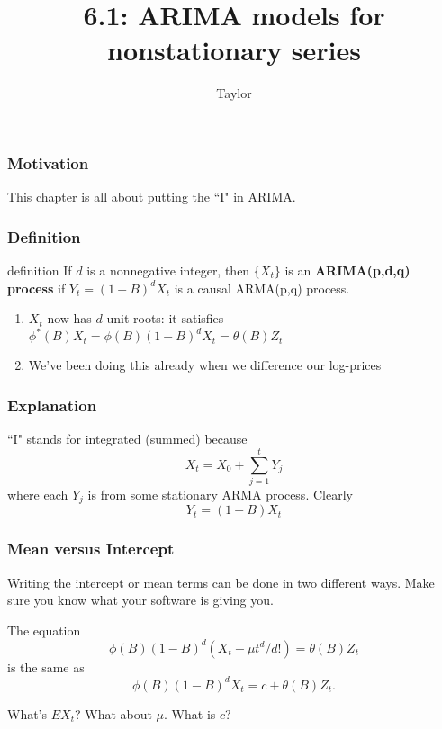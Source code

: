 \documentclass{beamer}
\title["6.1"]{6.1: ARIMA models for nonstationary series}
\author{Taylor}
\institute[UVA] 
{
University of Virginia \\
\medskip
\textit{} 
}
\date{}
\begin{document}

\begin{frame}
\titlepage 
\end{frame}


\begin{frame}
\frametitle{Motivation}

This chapter is all about putting the ``I" in ARIMA. 


\end{frame}


\begin{frame}
\frametitle{Definition}

\begin{block}{definition}
If $d$ is a nonnegative integer, then $\{X_t\}$ is an {\bf ARIMA(p,d,q) process } if $Y_t = (1-B)^dX_t$ is a causal ARMA(p,q) process.
\end{block}

\begin{enumerate}
\item $X_t$ now has $d$ unit roots: it satisfies $\phi^*(B)X_t = \phi(B)(1-B)^d X_t = \theta(B)Z_t $
\item We've been doing this already when we difference our log-prices
\end{enumerate}
\end{frame}

\begin{frame}
\frametitle{Explanation}

``I" stands for integrated (summed) because 
\[
X_t = X_0 + \sum_{j=1}^t Y_j
\]
where each $Y_j$ is from some stationary ARMA process. Clearly
\[
Y_t = (1-B)X_t 
\]

\end{frame}


\begin{frame}
\frametitle{Mean versus Intercept}

Writing the intercept or mean terms can be done in two different ways. Make sure you know what your software is giving you.
\newline

The equation
\[
\phi(B)(1-B)^d(X_t - \mu t^d / d!) = \theta(B)Z_t
\]
is the same as 
\[
\phi(B)(1-B)^dX_t = c + \theta(B)Z_t.
\]

What's $EX_t$? What about $\mu$. What is $c$?

\end{frame}
\end{document}

